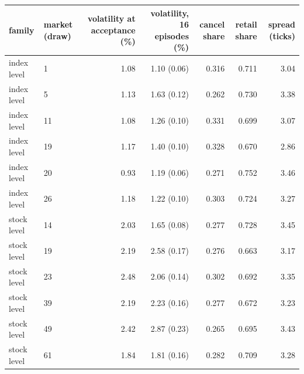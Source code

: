 \begin{tabular}{llrrrrr}
\toprule
family & market (draw) & volatility at acceptance (\%) & volatility, 16 episodes (\%) & cancel share & retail share & spread (ticks) \\
\midrule
index level & 1 & 1.08 & 1.10 (0.06) & 0.316 & 0.711 & 3.04 \\
index level & 5 & 1.13 & 1.63 (0.12) & 0.262 & 0.730 & 3.38 \\
index level & 11 & 1.08 & 1.26 (0.10) & 0.331 & 0.699 & 3.07 \\
index level & 19 & 1.17 & 1.40 (0.10) & 0.328 & 0.670 & 2.86 \\
index level & 20 & 0.93 & 1.19 (0.06) & 0.271 & 0.752 & 3.46 \\
index level & 26 & 1.18 & 1.22 (0.10) & 0.303 & 0.724 & 3.27 \\
stock level & 14 & 2.03 & 1.65 (0.08) & 0.277 & 0.728 & 3.45 \\
stock level & 19 & 2.19 & 2.58 (0.17) & 0.276 & 0.663 & 3.17 \\
stock level & 23 & 2.48 & 2.06 (0.14) & 0.302 & 0.692 & 3.35 \\
stock level & 39 & 2.19 & 2.23 (0.16) & 0.277 & 0.672 & 3.23 \\
stock level & 49 & 2.42 & 2.87 (0.23) & 0.265 & 0.695 & 3.43 \\
stock level & 61 & 1.84 & 1.81 (0.16) & 0.282 & 0.709 & 3.28 \\
\bottomrule
\end{tabular}

